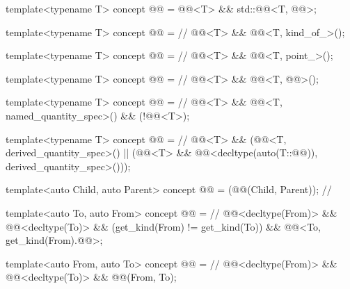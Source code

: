 \begin{itemdecl}
template<typename T>
concept @@ = @@<T> && std::@@<T, @@>;

template<typename T>
concept @@ =                                   // \expos
  @@<T> && @@<T, kind_of_>();

template<typename T>
concept @@ =                                  // \expos
  @@<T> && @@<T, point_>();

template<typename T>
concept @@ =                                  // \expos
  @@<T> && @@<T, @@>();

template<typename T>
concept @@ =                                  // \expos
  @@<T> && @@<T, named_quantity_spec>() &&
  (!@@<T>);

template<typename T>
concept @@ =                                // \expos
  @@<T> &&
  (@@<T, derived_quantity_spec>() ||
   (@@<T> &&
    @@<decltype(auto(T::@@)), derived_quantity_spec>()));

template<auto Child, auto Parent>
concept @@ = (@@(Child, Parent));  // \expos

template<auto To, auto From>
concept @@ =                           // \expos
  @@<decltype(From)> && @@<decltype(To)> &&
  (get_kind(From) != get_kind(To)) && @@<To, get_kind(From).@@>;

template<auto From, auto To>
concept @@ =                          // \expos
  @@<decltype(From)> && @@<decltype(To)> && @@(From, To);


\end{itemdecl}
